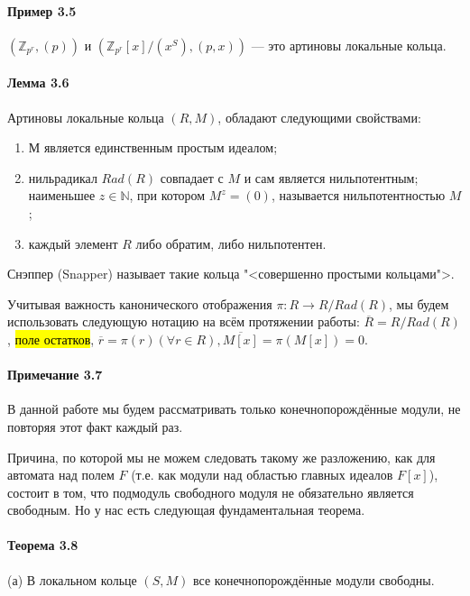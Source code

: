 \documentclass[a4paper,12pt]{article}
\begin{document}
\paragraph{Пример 3.5}
$(\mathbb{Z}_{p^r}, (p))$ и $(\mathbb{Z}_{p^r}[x]/(x^S), (p,x))$ --- это артиновы локальные кольца.

\paragraph{Лемма 3.6}
Артиновы локальные кольца $(R,M)$, обладают следующими свойствами:

\renewcommand{\labelenumi}{(\alph{enumi})}
\begin{enumerate}
	\item М является единственным простым идеалом;
	\item нильрадикал $Rad(R)$ совпадает с $M$ и сам является нильпотентным; наименьшее $z \in \mathbb{N}$, при котором $M^z = (0)$, называется нильпотентностью $M$;
	\item каждый элемент $R$ либо обратим, либо нильпотентен.
\end{enumerate}

Снэппер (Snapper) \cite{bib11} называет такие кольца "<совершенно простыми кольцами">.

Учитывая важность канонического отображения $\pi : R \rightarrow R / Rad(R)$, мы будем использовать следующую нотацию на всём протяжении работы: $\overline{R} = R / Rad(R)$, \hl{поле остатков}, $\overline{r} = \pi (r) (\forall r \in R), \overline{M[x]} = \pi (M[x]) = 0$.

\paragraph{Примечание 3.7}
В данной работе мы будем рассматривать только конечнопорождённые модули, не повторяя этот факт каждый раз.

Причина, по которой мы не можем следовать такому же разложению, как для автомата над полем $F$ (т.е. как модули над областью главных идеалов $F[x]$), состоит в том, что подмодуль свободного модуля не обязательно является свободным. Но у нас есть следующая фундаментальная теорема.

\paragraph{Теорема 3.8}
(а) В локальном кольце $(S, M)$ все конечнопорождённые модули свободны.


\pagebreak
\end{document}
